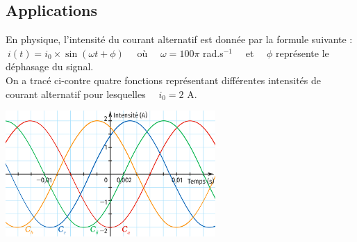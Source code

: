 \documentclass[a4paper,11pt,exos]{nsi} %
\begin{document}
\subsection*{Applications}

\begin{minipage}{8.5cm}
	\exo{}
	En physique, l'intensité du courant alternatif est donnée par la formule suivante : \\
	$\ i(t)=i_0\times \sin(\omega t+\phi)\quad$ où $\quad \omega=100\pi$ rad.s$^{-1}\quad$ et $\quad\phi$ représente le déphasage du signal.\\
	On a tracé ci-contre quatre fonctions représentant différentes intensités de courant alternatif pour lesquelles $\quad i_0=2$ A.
\end{minipage}
\begin{minipage}{8.5cm}
	\flushright \includegraphics[width=8cm]{courbe1}
\end{minipage}
\end{document}
